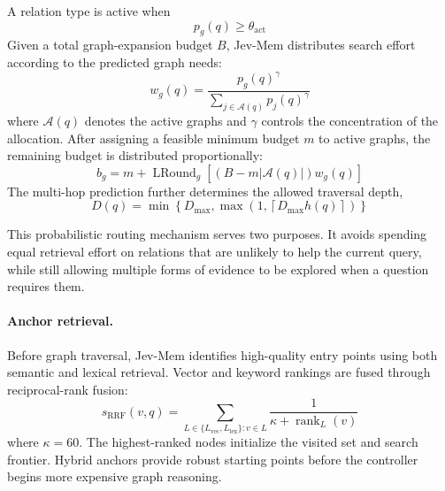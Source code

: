 \documentclass[11pt]{article}
\begin{document}
A relation type is active when
\begin{equation}
p_g(q)\geq\theta_{\mathrm{act}}
\end{equation}
Given a total graph-expansion budget $B$, Jev-Mem distributes search effort according to the predicted graph needs:
\begin{equation}
w_g(q)=
\frac{p_g(q)^\gamma}
{\sum_{j\in\mathcal{A}(q)}p_j(q)^\gamma}
\end{equation}
where $\mathcal{A}(q)$ denotes the active graphs and $\gamma$ controls the concentration of the allocation. After assigning a feasible minimum budget $m$ to active graphs, the remaining budget is distributed proportionally:
\begin{equation}
b_g =
m+
\operatorname{LRound}_g
\left[
(B-m|\mathcal{A}(q)|)w_g(q)
\right]
\end{equation}
The multi-hop prediction further determines the allowed traversal depth,
\begin{equation}
D(q)=
\min
\left\{
D_{\max},
\max
\left(
1,
\left\lceil D_{\max}h(q)\right\rceil
\right)
\right\}
\end{equation}

This probabilistic routing mechanism serves two purposes. It avoids spending equal retrieval effort on relations that are unlikely to help the current query, while still allowing multiple forms of evidence to be explored when a question requires them.

\paragraph{Anchor retrieval.}
Before graph traversal, Jev-Mem identifies high-quality entry points using both semantic and lexical retrieval. Vector and keyword rankings are fused through reciprocal-rank fusion:
\begin{equation}
s_{\mathrm{RRF}}(v,q)=
\sum_{
L\in\{L_{\mathrm{vec}},L_{\mathrm{lex}}\}:v\in L
}
\frac{1}{\kappa+\operatorname{rank}_L(v)}
\end{equation}
where $\kappa=60$. The highest-ranked nodes initialize the visited set and search frontier. Hybrid anchors provide robust starting points before the controller begins more expensive graph reasoning.
\end{document}
